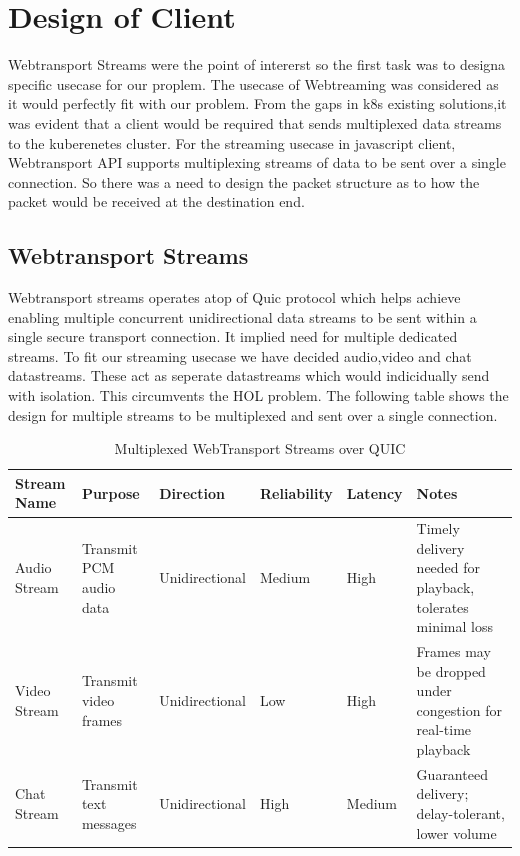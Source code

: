 \section{Design of Client}
Webtransport Streams were the point of intererst so the first task was to designa  specific usecase for our proplem. The usecase of Webtreaming was considered as it would perfectly fit with our problem. From the gaps in k8s existing solutions,it was evident that a client would be required that sends multiplexed data streams to the kuberenetes cluster. For the streaming usecase in javascript client, Webtransport API supports multiplexing streams of data to be sent over a single connection. So there was a need to design the packet structure as to how the packet would be received at the destination end. 

\subsection{Webtransport Streams}
Webtransport streams operates atop of Quic protocol which helps achieve enabling multiple concurrent unidirectional data streams to be sent within a single secure transport connection. It implied need for multiple dedicated streams. To fit our streaming usecase we have decided audio,video and chat datastreams. These act as seperate datastreams which would indicidually send with isolation. This circumvents the HOL problem. The following table shows the design for multiple streams to be multiplexed and sent over a single connection.


\begin{table}[h!]
\renewcommand{\arraystretch}{0.9}
\small
\centering
\begin{tabularx}{\textwidth}{|l|X|l|l|l|X|}
\hline
\textbf{Stream Name} & \textbf{Purpose} & \textbf{Direction} & \textbf{Reliability} & \textbf{Latency} & \textbf{Notes} \\
\hline
Audio Stream & Transmit PCM audio data & Unidirectional & Medium & High & Timely delivery needed for playback, tolerates minimal loss \\
\hline
Video Stream & Transmit video frames & Unidirectional & Low & High & Frames may be dropped under congestion for real-time playback \\
\hline
Chat Stream & Transmit text messages & Unidirectional & High & Medium & Guaranteed delivery; delay-tolerant, lower volume \\
\hline
\end{tabularx}
\caption{Multiplexed WebTransport Streams over QUIC}
\label{tab:webtransport-streams}
\end{table}





